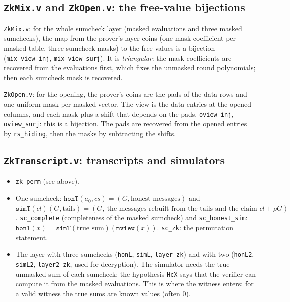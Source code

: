 \documentclass[11pt,a4paper]{article}
\theoremstyle{definition}
\theoremstyle{plain}
\begin{document}
\subsection{\texttt{ZkMix.v} and \texttt{ZkOpen.v}: the free-value bijections}

\texttt{ZkMix.v}: for the whole sumcheck layer (masked evaluations and three masked sumchecks), the map
from the prover's layer coins (one mask coefficient per masked table, three sumcheck masks) to the
free values is a bijection (\texttt{mix\_view\_inj}, \texttt{mix\_view\_surj}). It is \emph{triangular}:
the mask coefficients are recovered from the evaluations first, which fixes the unmasked round
polynomials; then each sumcheck mask is recovered.

\texttt{ZkOpen.v}: for the opening, the prover's coins are the pads of the data rows and one uniform
mask per masked vector. The view is the data entries at the opened columns, and each mask plus a
shift that depends on the pads. \texttt{oview\_inj}, \texttt{oview\_surj}: this is a bijection. The pads
are recovered from the opened entries by \texttt{rs\_hiding}, then the masks by subtracting the
shifts.

\subsection{\texttt{ZkTranscript.v}: transcripts and simulators}

\begin{itemize}[leftmargin=1.3em]
\item \texttt{zk\_perm} (see above).
\item One sumcheck: $\mathtt{honT}(a_0,cs)=(G,\text{honest messages})$ and
  $\mathtt{simT}(cl)(G,\text{tails})=(G,\ \text{the messages rebuilt from the tails and the claim } cl+\rho G)$.
  \texttt{sc\_complete} (completeness of the masked sumcheck) and \texttt{sc\_honest\_sim}:
  $\mathtt{honT}(x)=\mathtt{simT}(\text{true sum})(\mathtt{mview}(x))$. \texttt{sc\_zk}: the permutation statement.
\item The layer with three sumchecks (\texttt{honL}, \texttt{simL}, \texttt{layer\_zk}) and with two
  (\texttt{honL2}, \texttt{simL2}, \texttt{layer2\_zk}, used for decryption). The simulator needs the true
  unmasked sum of each sumcheck; the hypothesis \texttt{HcX} says that the verifier can compute it
  from the masked evaluations. This is where the witness enters: for a valid witness the true sums
  are known values (often $0$).
\end{itemize}
\end{document}
